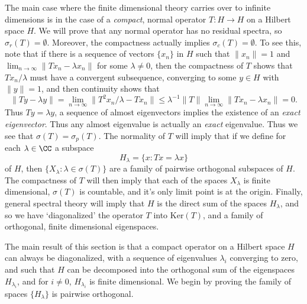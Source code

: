 The main case where the finite dimensional theory carries over to infinite dimensions is in the case of a \emph{compact}, normal operator $T: H \to H$ on a Hilbert space $H$. We will prove that any normal operator has no residual spectra, so $\sigma_r(T) = \emptyset$. Moreover, the compactness actually implies $\sigma_c(T) = \emptyset$. To see this, note that if there is a sequence of vectors $\{ x_n \}$ in $H$ such that $\| x_n \| = 1$ and $\lim_{n \to \infty} \| Tx_n - \lambda x_n \|$ for some $\lambda \neq 0$, then the compactness of $T$ shows that $Tx_n / \lambda$ must have a convergent subsequence, converging to some $y \in H$ with $\| y \| = 1$, and then continuity shows that
%
\[ \| Ty - \lambda y \| = \lim_{n \to \infty} \| T^2 x_n / \lambda - T x_n \| \leq \lambda^{-1} \| T \| \lim_{n \to \infty} \| Tx_n - \lambda x_n \| = 0. \]
%
Thus $Ty = \lambda y$, a sequence of almost eigenvectors implies the existence of an \emph{exact eigenvector}. Thus any almost eigenvalue is actually an \emph{exact} eigenvalue. Thus we see that $\sigma(T) = \sigma_p(T)$. The normality of $T$ will imply that if we define for each $\lambda \in \CC$ a subspace
%
\[ H_\lambda = \{ x : Tx = \lambda x \} \]
%
of $H$, then $\{ X_\lambda : \lambda \in \sigma(T) \}$ are a family of pairwise orthogonal subspaces of $H$. The compactness of $T$ will then imply that each of the spaces $X_\lambda$ is finite dimensional, $\sigma(T)$ is countable, and it's only limit point is at the origin. Finally, general spectral theory will imply that $H$ is the direct sum of the spaces $H_\lambda$, and so we have `diagonalized' the operator $T$ into $\text{Ker}(T)$, and a family of orthogonal, finite dimensional eigenspaces.

The main result of this section is that a compact operator on a Hilbert space $H$ can always be diagonalized, with a sequence of eigenvalues $\lambda_i$ converging to zero, and such that $H$ can be decomposed into the orthogonal sum of the eigenspaces $H_{\lambda_i}$, and for $i \neq 0$, $H_{\lambda_i}$ is finite dimensional. We begin by proving the family of spaces $\{ H_\lambda \}$ is pairwise orthogonal.

